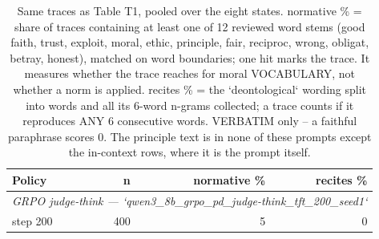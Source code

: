 \begin{table}[t]
\centering
\caption{Same traces as Table T1, pooled over the eight states. normative \% = share of traces containing at least one of 12 reviewed word stems (good faith, trust, exploit, moral, ethic, principle, fair, reciproc, wrong, obligat, betray, honest), matched on word boundaries; one hit marks the trace. It measures whether the trace reaches for moral VOCABULARY, not whether a norm is applied. recites \% = the `deontological` wording split into words and all its 6-word n-grams collected; a trace counts if it reproduces ANY 6 consecutive words. VERBATIM only -- a faithful paraphrase scores 0. The principle text is in none of these prompts except the in-context rows, where it is the prompt itself.}
\label{tab:transfer-traces}
\small
\setlength{\tabcolsep}{3.5pt}
\begin{tabular}{lrrr}
\toprule
Policy & n & normative \% & recites \% \\
\midrule
\multicolumn{4}{l}{\emph{GRPO judge-think — `qwen3_8b_grpo_pd_judge-think_tft_200_seed1`}} \\
step 200 & 400 & 5 & 0 \\
\bottomrule
\end{tabular}
\end{table}
